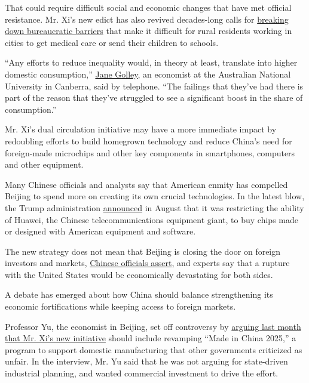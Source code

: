 That could require difficult social and economic changes that have met
official resistance. Mr. Xi's new edict has also revived decades-long
calls for
\href{https://finance.sina.com.cn/review/hgds/2020-08-19/doc-iivhuipn9395668.shtml}{breaking
down bureaucratic barriers} that make it difficult for rural residents
working in cities to get medical care or send their children to schools.

``Any efforts to reduce inequality would, in theory at least, translate
into higher domestic consumption,''
\href{https://researchers.anu.edu.au/researchers/golley-je}{Jane
Golley}, an economist at the Australian National University in Canberra,
said by telephone. ``The failings that they've had there is part of the
reason that they've struggled to see a significant boost in the share of
consumption.''

Mr. Xi's dual circulation initiative may have a more immediate impact by
redoubling efforts to build homegrown technology and reduce China's need
for foreign-made microchips and other key components in smartphones,
computers and other equipment.

Many Chinese officials and analysts say that American enmity has
compelled Beijing to spend more on creating its own crucial
technologies. In the latest blow, the Trump administration
\href{https://www.nytimes3xbfgragh.onion/2020/08/17/technology/trump-huawei-commerce-chips.html}{announced}
in August that it was restricting the ability of Huawei, the Chinese
telecommunications equipment giant, to buy chips made or designed with
American equipment and software.

The new strategy does not mean that Beijing is closing the door on
foreign investors and markets,
\href{http://www.xinhuanet.com/politics/leaders/2020-08/24/c_1126407763.htm}{Chinese
officials assert}, and experts say that a rupture with the United States
would be economically devastating for both sides.

A debate has emerged about how China should balance strengthening its
economic fortifications while keeping access to foreign markets.

Professor Yu, the economist in Beijing, set off controversy by
\href{https://new.qq.com/omn/20200819/20200819A0CBG700.html}{arguing
last month that Mr. Xi's new initiative} should include revamping ``Made
in China 2025,'' a program to support domestic manufacturing that other
governments criticized as unfair. In the interview, Mr. Yu said that he
was not arguing for state-driven industrial planning, and wanted
commercial investment to drive the effort.

